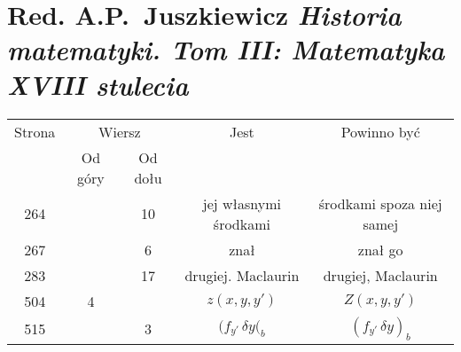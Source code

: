 \documentclass[a4paper,11pt]{article}
\numberwithin{equation}{section}
\begin{document}
\newpage

\section{Red. A.P.~Juszkiewicz
  \textit{Historia matematyki. Tom III: Matematyka XVIII stulecia}
  \parencite{Red-Juszkiewicz-Historia-matematyki-Vol-III-Pub-1977}}

































\begin{center}

  \begin{tabular}{|c|c|c|c|c|}
    \hline
    Strona & \multicolumn{2}{c|}{Wiersz} & Jest
                              & Powinno być \\ \cline{2-3}
    & Od góry & Od dołu & & \\
    \hline
    264 & & 10 & jej własnymi środkami & środkami spoza niej samej \\
    267 & & \hphantom{0}6 & znał & znał go \\
    283 & & 17 & drugiej. Maclaurin & drugiej, Maclaurin \\
    504 & \hphantom{0}4 & & $z( x, y, y' )$ & $Z( x, y, y' )$ \\
    515 & & \hphantom{0}3 & $( f_{ y' } \, \delta y(_{ b }$
    & $( f_{ y' } \, \delta y )_{ b }$ \\
    \hline
  \end{tabular}

\end{center}
\end{document}
